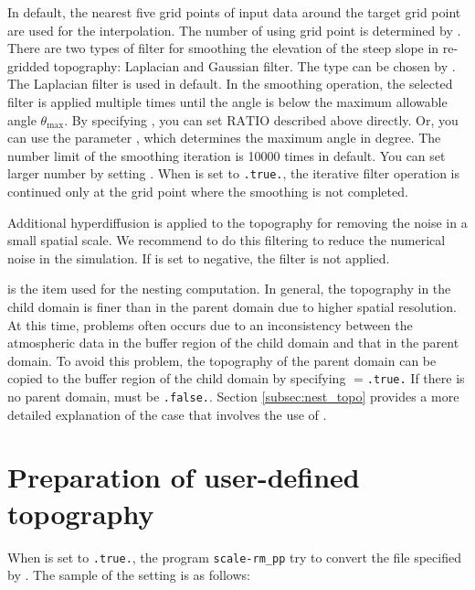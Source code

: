 In default, the nearest five grid points of input data around the target grid point are used for the interpolation. The number of using grid point is determined by .
There are two types of filter for smoothing the elevation of the steep slope in re-gridded topography: Laplacian and Gaussian filter.
The type can be chosen by . The Laplacian filter is used in default.
In the smoothing operation, the selected filter is applied multiple times until the angle is below the maximum allowable angle $\theta_{\max}$.
By specifying , you can set $\mathrm{RATIO}$ described above directly. Or, you can use the parameter , which determines the maximum angle in degree.
The number limit of the smoothing iteration is 10000 times in default. You can set larger number by setting .
When  is set to \verb|.true.|, the iterative filter operation is continued only at the grid point where the smoothing is not completed.

Additional hyperdiffusion is applied to the topography for removing the noise in a small spatial scale. We recommend to do this filtering to reduce the numerical noise in the simulation.
If  is set to negative, the filter is not applied.

 is the item used for the nesting computation.
In general, the topography in the child domain is finer than in the parent domain due to higher spatial resolution.
At this time, problems often occurs due to
an inconsistency between
the atmospheric data in the buffer region of the child domain and that in the parent domain.
To avoid this problem, the topography of the parent domain can be copied to the buffer region of the child domain by specifying $=$\verb|.true.| If there is no parent domain,  must be \verb|.false.|. Section \ref{subsec:nest_topo} provides a more detailed explanation of the case that involves the use of .



\section{Preparation of user-defined topography} \label{subsec:topo_userfile}

When  is set to \verb|.true.|, the program \verb|scale-rm_pp| try to convert the file specified by .
The sample of the setting is as follows:

